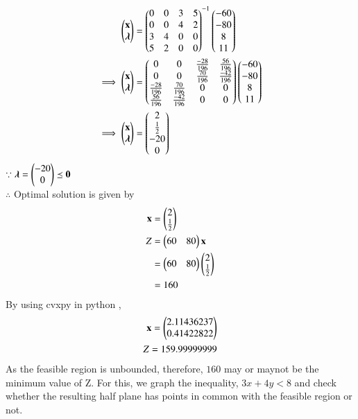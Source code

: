 \documentclass[journal,12pt,twocolumn]{IEEEtran}
\begin{document}
\begin{align}
    \begin{pmatrix}\mathbf{x} \\ \boldsymbol{\lambda}\end{pmatrix} &= \begin{pmatrix}0 & 0 & 3 & 5 \\ 0 & 0 & 4 & 2 \\ 3 & 4 & 0 & 0 \\ 5 & 2 & 0 & 0\end{pmatrix}^{-1}\begin{pmatrix}-60 \\-80 \\ 8 \\ 11\end{pmatrix}
    \\
    \implies   \begin{pmatrix}\mathbf{x} \\ \boldsymbol{\lambda}\end{pmatrix} &= \begin{pmatrix}0 & 0 & \frac{-28}{196} & \frac{56}{196} \\ 0 & 0 & \frac{70}{196} & \frac{-42}{196} \\ \frac{-28}{196} & \frac{70}{196} & 0 & 0 \\ \frac{56}{196} & \frac{-42}{196} & 0 & 0\end{pmatrix}\begin{pmatrix}-60 \\-80 \\ 8 \\ 11\end{pmatrix}
    \\
    \implies \begin{pmatrix}\mathbf{x} \\ \boldsymbol{\lambda}\end{pmatrix} &= \begin{pmatrix}2 \\ \frac{1}{2} \\ -20 \\ 0 \end{pmatrix}
\end{align}
$\because \boldsymbol{\lambda}=\begin{pmatrix}-20 \\ 0\end{pmatrix} \preceq \mathbf{0} $
\\
$\therefore$ Optimal solution is given by
\begin{align}
    \mathbf{x} &= \begin{pmatrix}2\\ \frac{1}{2}\end{pmatrix} \\
    Z &= \begin{pmatrix}60 & 80\end{pmatrix}\mathbf{x} \\
    &= \begin{pmatrix}60 & 80\end{pmatrix}\begin{pmatrix}2 \\ \frac{1}{2}\end{pmatrix} \\
    &= 160
\end{align}
By using cvxpy in python ,
\begin{align}
    \mathbf{x}=\begin{pmatrix}2.11436237\\0.41422822\end{pmatrix}\\
    Z = 159.99999999
\end{align}
As the feasible region is unbounded, therefore, $160$ may or maynot be the minimum value of Z. For this, we graph the inequality, $3x+4y<8$ and check whether the resulting half plane has points in common with the feasible region or not.\\
\end{document}
